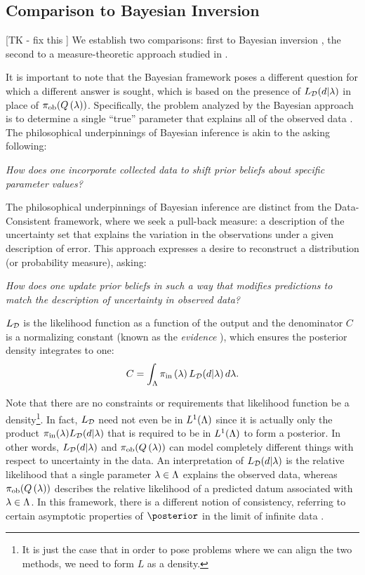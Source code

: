 \subsection{Comparison to Bayesian Inversion}\label{sec:othermethods}
[TK - fix this ] We establish two comparisons: first to Bayesian inversion \cite{Walpole, Berger, Complete, Smith}, the second to a measure-theoretic approach studied in \cite{BET+14, BE13}.

It is important to note that the Bayesian framework poses a different question for which a different answer is sought, which is based on the presence of $L_{\mathcal{D}}(d | \lambda)$ in place of $\operatorname*{\pi_{ob}}(Q\left ( \lambda \right ))$.
Specifically, the problem analyzed by the Bayesian approach is to determine a single ``true'' parameter that explains all of the observed data \cite{Smith, Concrete, Complete}.
The philosophical underpinnings of Bayesian inference is akin to the asking following:

\begin{center}
  \emph{How does one incorporate collected data to shift prior beliefs about specific parameter values?}
\end{center}

The philosophical underpinnings of Bayesian inference are distinct from the Data-Consistent framework, where we seek a pull-back measure: a description of the uncertainty set that explains the variation in the observations under a given description of error.
This approach expresses a desire to reconstruct a distribution (or probability measure), asking:

\begin{center}
  \emph{How does one update prior beliefs in such a way that modifies predictions to match the description of uncertainty in observed data?}
\end{center}


$L_{\mathcal{D}}$ is the likelihood function as a function of the output and the denominator $C$ is a normalizing constant (known as the \emph{evidence} \cite{Smith}), which ensures the posterior density integrates to one:
\[
C = \int_{\Lambda} \operatorname*{\pi_{in}}\left ( \lambda \right ) L_{\mathcal{D}}(d | \lambda) \, d\lambda.
\]

Note that there are no constraints or requirements that likelihood function be a density\footnote{It is just the case that in order to pose problems where we can align the two methods, we need to form $L$ as a density.}.
In fact, $L_{\mathcal{D}}$ need not even be in $L^1({\Lambda})$ since it is actually only the product $\operatorname*{\pi_{in}}(\lambda) L_{\mathcal{D}} (d | \lambda)$ that is required to be in $L^1({\Lambda})$ to form a posterior.
In other words, $L_{\mathcal{D}} (d | \lambda)$ and $\operatorname*{\pi_{ob}}(Q\left ( \lambda \right ))$ can model completely different things with respect to uncertainty in the data.
An interpretation of $L_{\mathcal{D}} (d | \lambda)$ is the relative likelihood that a single parameter $\lambda\in{\Lambda}$ explains the observed data, whereas $\operatorname*{\pi_{ob}}(Q\left ( \lambda \right ))$ describes the relative likelihood of a predicted datum associated with $\lambda\in{\Lambda}$.
In this framework, there is a different notion of consistency, referring to certain asymptotic properties of $\posterior$ in the limit of infinite data \cite{Barron, Silverman}.




